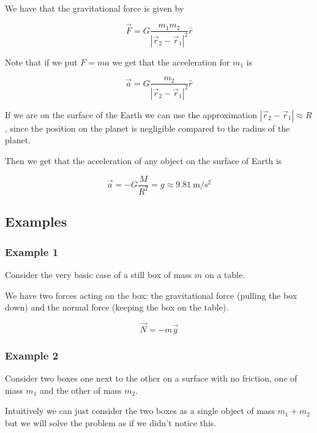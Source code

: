 \documentclass[14pt]{extarticle}
\begin{document}
We have that the gravitational force is given by

$$
  \vec F = G \frac{ m_1 m_2}{|\vec r_2 - \vec r_1|^2} \hat r
$$

Note that if we put $F = ma$ we get that the acceleration for $m_1$ is

$$
  \vec a = G \frac{m_2}{|\vec r_2 - \vec r_1|^2} \hat r
$$

If we are on the surface of the Earth we can use the approximation $|\vec r_2 - \vec r_1| \approx R$, since the position on the planet is negligible compared to the radius of the planet.

Then we get that the acceleration of any object on the surface of Earth is

$$
  \vec a = - G \frac{M}{R^2} = g \approx \SI{9.81}{\meter \per \second \squared}
$$

\subsection{Examples}

\subsubsection{Example 1}

Consider the very basic case of a still box of mass $m$ on a table.

We have two forces acting on the box: the gravitational force (pulling the box down) and the normal force (keeping the box on the table).

$$
  \vec N = - m \vec g
$$

\subsubsection{Example 2}

Consider two boxes one next to the other on a surface with no friction, one of mass $m_1$ and the other of mass $m_2$.

\begin{center}
\end{center}

Intuitively we can just consider the two boxes as a single object of mass $m_1 + m_2$ but we will solve the problem as if we didn't notice this.
\end{document}
